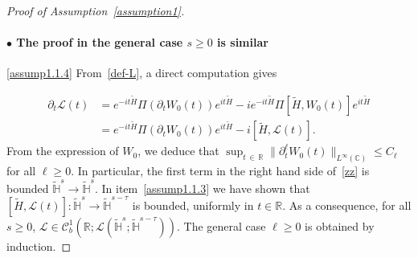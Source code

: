\documentclass[AHL,Unicode,published]{cedram}
\newcommand{\C}{\mathbb{C}}
\newcommand{\R}{\mathbb{R}}
\newcommand{\HH}{\mathbb{H}}
\newcommand{\clL}{\mathcal{L}}
\newcommand{\clC}{\mathcal{C}}
\renewcommand{\L}{\mathscr{L}}
\newcommand{\wt}{\widetilde}
\newcommand{\<}{\langle}
\renewcommand{\>}{\rangle}
\newcommand{\R}{\mathbb{R}}
\begin{document}
\begin{proof}[{Proof of Assumption~\ref{assumption1}}]
\paragraph{$\bullet$ The proof in the general case $s\geq 0$ is similar}\phantom{--}

\eqref{assump1.1.4} From~\eqref{def-L}, a direct computation gives

\begin{equation}\label{zz}
\begin{aligned}
\partial_t \L(t)&= e^{-it \wt{H}} \Pi \left(\partial_t W_0(t)\right)e^{it \wt{H}} -i e^{-it \wt{H}} \Pi \left[\wt{H}, W_0(t)\right]e^{it \wt{H}}\\
&= e^{-it \wt{H}} \Pi \left(\partial_t W_0(t)\right)e^{it \wt{H}} -i \left[\wt{H}, \L(t)\right].
\end{aligned}
\end{equation}
From the expression of $W_0$, we deduce that $\sup_{t\,\in\,\R}\| \partial^{\ell}_t W_0(t)\|_{L^{\infty}(\C)} \leq C_{\ell}$ for all $\ell \geq 0$. In particular, the first term in the right hand side of~\eqref{zz} is bounded $\widetilde{\HH}^{s} \longrightarrow \widetilde{\HH}^{s}$. In item~\eqref{assump1.1.3} we have shown that $[\wt{H}, \L(t)] : \widetilde{\HH}^{s} \longrightarrow \widetilde{\HH}^{s-\tau}$ is bounded, uniformly in $t\in
\R$. As a consequence, for all $s\geq 0$, $\L \in \clC^{1}_b(\R; \clL(\widetilde{\HH}^{s} ; \widetilde{\HH}^{s- \tau}))$. The general case $\ell\geq 0$ is obtained by induction.
\end{proof}
\end{document}
